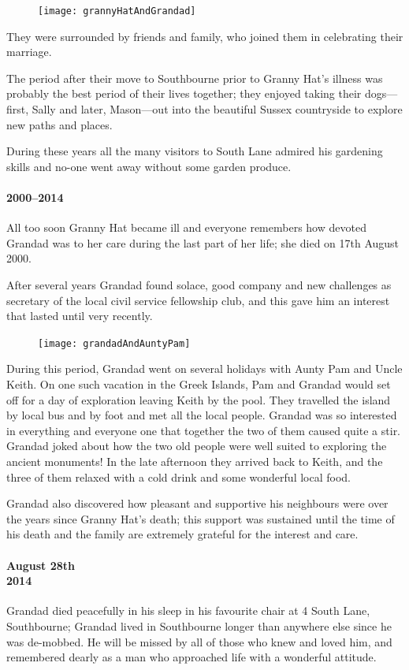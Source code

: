 \begin{figure}
	\centering
	\texttt{[image: grannyHatAndGrandad]}
\end{figure}
They were surrounded by friends and family, who joined them in celebrating their
marriage.

The period after their move to Southbourne  prior to Granny Hat's illness was probably the best period
of their lives together; they enjoyed taking their dogs---first, Sally
and later, Mason---out into the beautiful Sussex countryside to explore new paths and places.

During these years all the many visitors to South Lane admired his gardening skills and no-one went away without some garden produce.

\paragraph{2000--2014}
All too soon Granny Hat became ill and everyone remembers how devoted Grandad was
to her care during the last part of her life; she died on 17th August 2000.

After several years Grandad found solace,  good company and new challenges as
secretary of the local civil service fellowship club, and this gave him an
interest
that lasted until very recently.

\begin{figure}
	\centering
	\texttt{[image: grandadAndAuntyPam]}
\end{figure}
During this period, Grandad went on several holidays with Aunty Pam and Uncle Keith.
On one such vacation in the Greek Islands, Pam and Grandad would set
off for a day of exploration leaving Keith by the pool. They travelled the island
by local bus and by foot and met all the local people. Grandad was so interested in
everything and everyone one that together the two of them caused quite a stir.
Grandad joked about how the two old people were well suited to exploring the
ancient monuments! In the late afternoon they arrived back to 
Keith, and the three of them relaxed with a cold drink and some wonderful local
food.

Grandad also discovered how pleasant and supportive his neighbours were over
the years since Granny Hat's death; this support was sustained until the time
of his death
and the family are extremely grateful for the interest and care. 

\paragraph{August 28th\\ 2014} Grandad died peacefully in his sleep in his favourite chair at 4 South Lane, Southbourne;
Grandad lived in Southbourne longer than anywhere else since he was de-mobbed.
He will be missed by all of those
who knew and loved him, and remembered dearly as a man who approached life with a wonderful attitude.

